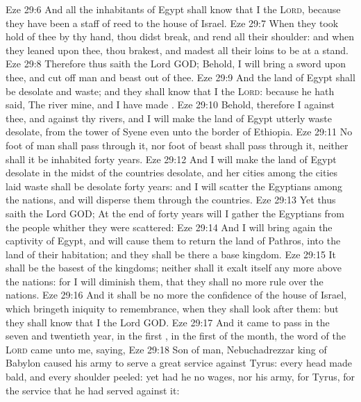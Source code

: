 \vs Eze 29:6 And all the inhabitants of Egypt shall know that I  the \textsc{Lord}, because they have been a staff of reed to the house of Israel.
\vs Eze 29:7 When they took hold of thee by thy hand, thou didst break, and rend all their shoulder: and when they leaned upon thee, thou brakest, and madest all their loins to be at a stand.
\vs Eze 29:8 Therefore thus saith the Lord GOD; Behold, I will bring a sword upon thee, and cut off man and beast out of thee.
\vs Eze 29:9 And the land of Egypt shall be desolate and waste; and they shall know that I  the \textsc{Lord}: because he hath said, The river  mine, and I have made .
\vs Eze 29:10 Behold, therefore I  against thee, and against thy rivers, and I will make the land of Egypt utterly waste  desolate, from the tower of Syene even unto the border of Ethiopia.
\vs Eze 29:11 No foot of man shall pass through it, nor foot of beast shall pass through it, neither shall it be inhabited forty years.
\vs Eze 29:12 And I will make the land of Egypt desolate in the midst of the countries  desolate, and her cities among the cities  laid waste shall be desolate forty years: and I will scatter the Egyptians among the nations, and will disperse them through the countries.
\vs Eze 29:13 Yet thus saith the Lord GOD; At the end of forty years will I gather the Egyptians from the people whither they were scattered:
\vs Eze 29:14 And I will bring again the captivity of Egypt, and will cause them to return  the land of Pathros, into the land of their habitation; and they shall be there a base kingdom.
\vs Eze 29:15 It shall be the basest of the kingdoms; neither shall it exalt itself any more above the nations: for I will diminish them, that they shall no more rule over the nations.
\vs Eze 29:16 And it shall be no more the confidence of the house of Israel, which bringeth  iniquity to remembrance, when they shall look after them: but they shall know that I  the Lord GOD.
\vs Eze 29:17 And it came to pass in the seven and twentieth year, in the first , in the first  of the month, the word of the \textsc{Lord} came unto me, saying,
\vs Eze 29:18 Son of man, Nebuchadrezzar king of Babylon caused his army to serve a great service against Tyrus: every head  made bald, and every shoulder  peeled: yet had he no wages, nor his army, for Tyrus, for the service that he had served against it:
